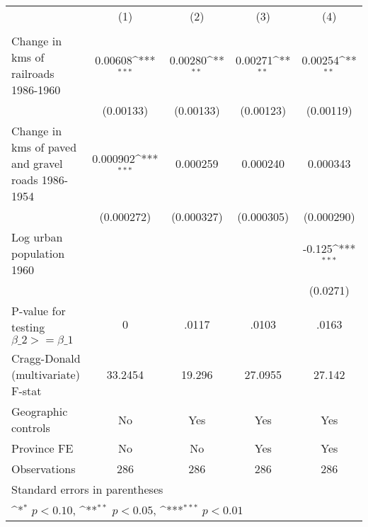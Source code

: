 {
\def\sym#1{\ifmmode^{#1}\else\(^{#1}\)\fi}
\begin{tabular}{l*{4}{c}}
\hline\hline
                &\multicolumn{1}{c}{(1)}&\multicolumn{1}{c}{(2)}&\multicolumn{1}{c}{(3)}&\multicolumn{1}{c}{(4)}\\
                &\multicolumn{1}{c}{}&\multicolumn{1}{c}{}&\multicolumn{1}{c}{}&\multicolumn{1}{c}{}\\
\hline
Change in kms of railroads 1986-1960&  0.00608\sym{***}&  0.00280\sym{**} &  0.00271\sym{**} &  0.00254\sym{**} \\
                &(0.00133)         &(0.00133)         &(0.00123)         &(0.00119)         \\
[1em]
Change in kms of paved and gravel roads 1986-1954& 0.000902\sym{***}& 0.000259         & 0.000240         & 0.000343         \\
                &(0.000272)         &(0.000327)         &(0.000305)         &(0.000290)         \\
[1em]
Log urban population 1960&                  &                  &                  &   -0.125\sym{***}\\
                &                  &                  &                  & (0.0271)         \\
\hline
P-value for testing $\beta\_{2} >= \beta\_{1}$&        0         &    .0117         &    .0103         &    .0163         \\
Cragg-Donald (multivariate) F-stat&  33.2454         &   19.296         &  27.0955         &   27.142         \\
Geographic controls&       No         &      Yes         &      Yes         &      Yes         \\
Province FE     &       No         &       No         &      Yes         &      Yes         \\
Observations    &      286         &      286         &      286         &      286         \\
\hline\hline
\multicolumn{5}{l}{\footnotesize Standard errors in parentheses}\\
\multicolumn{5}{l}{\footnotesize \sym{*} \(p<0.10\), \sym{**} \(p<0.05\), \sym{***} \(p<0.01\)}\\
\end{tabular}
}
